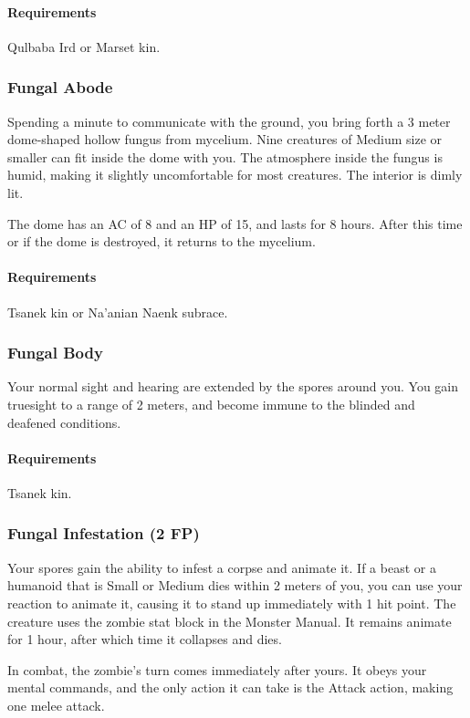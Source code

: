     \paragraph{Requirements} Qulbaba Ird or Marset kin.
\subsubsection{Fungal Abode} \label{feat::fungalabode}
    Spending a minute to communicate with the ground, you bring forth a 3 meter dome-shaped hollow fungus from mycelium.
    Nine creatures of Medium size or smaller can fit inside the dome with you.
    The atmosphere inside the fungus is humid, making it slightly uncomfortable for most creatures.
    The interior is dimly lit.

    The dome has an AC of 8 and an HP of 15, and lasts for 8 hours.
    After this time or if the dome is destroyed, it returns to the mycelium.
    \paragraph{Requirements} Tsanek kin or Na'anian Naenk subrace.
\subsubsection{Fungal Body} \label{feat::fungalbody}
    Your normal sight and hearing are extended by the spores around you.
    You gain truesight to a range of 2 meters, and become immune to the blinded and deafened conditions.
    \paragraph{Requirements} Tsanek kin.
\subsubsection{Fungal Infestation (2 FP)} \label{feat::fungalinfestation}
    Your spores gain the ability to infest a corpse and animate it.
    If a beast or a humanoid that is Small or Medium dies within 2 meters of you, you can use your reaction to animate it, causing it to stand up immediately with 1 hit point.
    The creature uses the zombie stat block in the Monster Manual.
    It remains animate for 1 hour, after which time it collapses and dies.

    In combat, the zombie's turn comes immediately after yours.
    It obeys your mental commands, and the only action it can take is the Attack action, making one melee attack.


